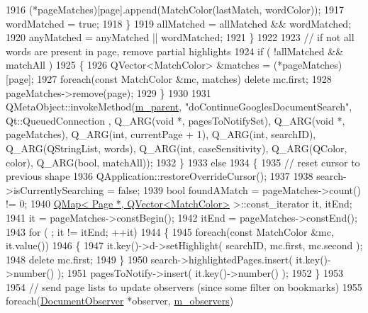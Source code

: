 \begin{DoxyCode}
1916                 (*pageMatches)[page].append(MatchColor(lastMatch, wordColor));
1917                 wordMatched = \textcolor{keyword}{true};
1918             \}
1919             allMatched = allMatched && wordMatched;
1920             anyMatched = anyMatched || wordMatched;
1921         \}
1922 
1923         \textcolor{comment}{// if not all words are present in page, remove partial highlights}
1924         \textcolor{keywordflow}{if} ( !allMatched && matchAll )
1925         \{
1926             QVector<MatchColor> &matches = (*pageMatches)[page];
1927             \textcolor{keywordflow}{foreach}(\textcolor{keyword}{const} MatchColor &mc, matches) \textcolor{keyword}{delete} mc.first;
1928             pageMatches->remove(page);
1929         \}
1930 
1931         QMetaObject::invokeMethod(\hyperlink{classOkular_1_1DocumentPrivate_ac921eda41c014869ffec96ecc569c713}{m\_parent}, \textcolor{stringliteral}{"doContinueGooglesDocumentSearch"}, Qt::QueuedConnection
      , Q\_ARG(\textcolor{keywordtype}{void} *, pagesToNotifySet), Q\_ARG(\textcolor{keywordtype}{void} *, pageMatches), Q\_ARG(\textcolor{keywordtype}{int}, currentPage + 1), Q\_ARG(\textcolor{keywordtype}{int}, 
      searchID), Q\_ARG(QStringList, words), Q\_ARG(\textcolor{keywordtype}{int}, caseSensitivity), Q\_ARG(QColor, color), Q\_ARG(\textcolor{keywordtype}{bool}, matchAll));
1932     \}
1933     \textcolor{keywordflow}{else}
1934     \{
1935         \textcolor{comment}{// reset cursor to previous shape}
1936         QApplication::restoreOverrideCursor();
1937 
1938         search->isCurrentlySearching = \textcolor{keyword}{false};
1939         \textcolor{keywordtype}{bool} foundAMatch = pageMatches->count() != 0;
1940         \hyperlink{classQMap}{QMap< Page *, QVector<MatchColor>} >::const\_iterator it, itEnd;
1941         it = pageMatches->constBegin();
1942         itEnd = pageMatches->constEnd();
1943         \textcolor{keywordflow}{for} ( ; it != itEnd; ++it)
1944         \{
1945             \textcolor{keywordflow}{foreach}(\textcolor{keyword}{const} MatchColor &mc, it.value())
1946             \{
1947                 it.key()->d->setHighlight( searchID, mc.first, mc.second );
1948                 \textcolor{keyword}{delete} mc.first;
1949             \}
1950             search->highlightedPages.insert( it.key()->number() );
1951             pagesToNotify->insert( it.key()->number() );
1952         \}
1953 
1954         \textcolor{comment}{// send page lists to update observers (since some filter on bookmarks)}
1955         \textcolor{keywordflow}{foreach}(\hyperlink{classOkular_1_1DocumentObserver}{DocumentObserver} *observer, \hyperlink{classOkular_1_1DocumentPrivate_a604d83cdce56b4cab8d2bcccfc01fbfa}{m\_observers})

\end{DoxyCode}
